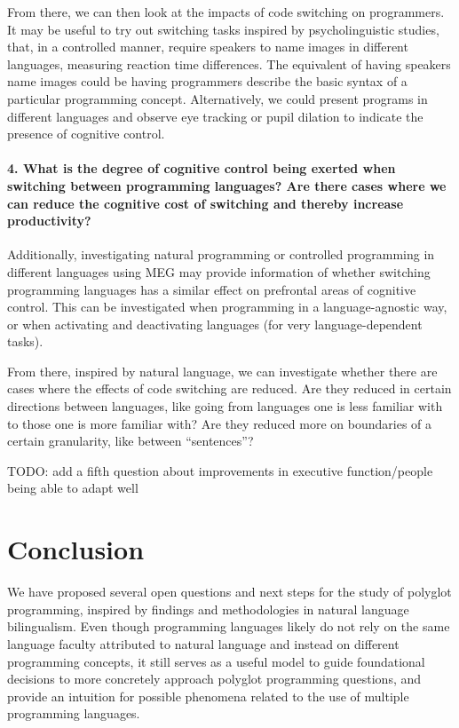 \documentclass[a4paper,UKenglish,cleveref, autoref]{oasics-v2019}
\begin{document}
From there, we can then look at the impacts of code switching on programmers. It may be useful to try out switching tasks inspired by psycholinguistic studies, that, in a controlled manner, require speakers to name images in different languages, measuring reaction time differences. The equivalent of having speakers name images could be having programmers describe the basic syntax of a particular programming concept. Alternatively, we could present programs in different languages and observe eye tracking or pupil dilation to indicate the presence of cognitive control. 
\paragraph*{4. What is the degree of cognitive control being exerted when switching between programming languages? Are there cases where we can reduce the cognitive cost of switching and thereby increase productivity?}

Additionally, investigating natural programming or controlled programming in different languages using MEG may provide information of whether switching programming languages has a similar effect on prefrontal areas of cognitive control. This can be investigated when programming in a language-agnostic way, or when activating and deactivating languages (for very language-dependent tasks). 
 
From there, inspired by natural language, we can investigate whether there are cases where the effects of code switching are reduced. Are they reduced in certain directions between languages, like going from languages one is less familiar with to those one is more familiar with? Are they reduced more on boundaries of a certain granularity, like between “sentences”?

TODO: add a fifth question about improvements in executive function/people being able to adapt well 

\section{Conclusion}
We have proposed several open questions and next steps for the study of polyglot programming, inspired by findings and methodologies in natural language bilingualism. Even though programming languages likely do not rely on the same language faculty attributed to natural language and instead on different programming concepts, it still serves as a useful model to guide foundational decisions to more concretely approach polyglot programming questions, and provide an intuition for possible phenomena related to the use of multiple programming languages. 
\end{document}
